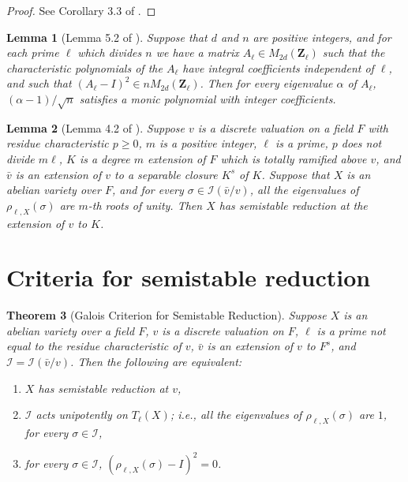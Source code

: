 \documentclass{amsart}
\def\Z{{\mathbf Z}}
\def\I{{\mathcal I}}
\newtheorem{thm}{Theorem}[section]
\newtheorem{lem}[thm]{Lemma}
\theoremstyle{definition}
\begin{document}
\begin{proof}
See Corollary 3.3 of \cite{serrelem}.
\end{proof}

\begin{lem}[Lemma 5.2 of \cite{semistab}]
\label{localglobal}
Suppose that $d$ and $n$ are positive integers, and for each prime $\ell$ 
which divides
$n$ we have a matrix $A_\ell \in M_{2d}(\Z_\ell)$ such that the
characteristic polynomials of the $A_\ell$ have integral coefficients
independent of $\ell$, and such that $(A_\ell - I)^2 \in nM_{2d}(\Z_\ell)$.
Then for every eigenvalue $\alpha$ of $A_\ell$, $(\alpha - 1)/\sqrt{n}$
satisfies a monic polynomial with integer coefficients.
\end{lem}

\begin{lem}[Lemma 4.2 of \cite{degree}]
\label{mevals}
Suppose $v$ is a discrete valuation on a field $F$ with residue
characteristic $p \ge 0$, $m$ is a positive integer, $\ell$ is a prime,
$p$ does not divide $m\ell$, $K$ is a degree $m$ extension of $F$
which is totally ramified above $v$, and ${\bar v}$ is an extension of $v$ to
a separable closure $K^s$ of $K$. Suppose that $X$ is an abelian variety over $F$,
and for every $\sigma \in \I({\bar v}/v)$,
all the eigenvalues of $\rho_{\ell,X}(\sigma)$ 
are $m$-th roots of unity. Then $X$ has
semistable reduction at the extension of $v$ to $K$.
\end{lem}

\section{Criteria for semistable reduction}

\begin{thm}[Galois Criterion for Semistable Reduction]
\label{galcrit}
Suppose $X$ is an abel\-ian variety over a field $F$, $v$ is a discrete 
valuation on $F$, $\ell$ is a prime not equal to the residue
characteristic of $v$, ${\bar v}$ is an extension of $v$ to $F^s$,
and $\I = \I({\bar v}/v)$. 
Then the following are equivalent:
\begin{enumerate}
\item[(i)] $X$ has semistable reduction at $v$,
\item[(ii)] $\I$ acts unipotently on $T_\ell(X)$; i.e.,
all the eigenvalues of $\rho_{\ell,X}(\sigma)$ are $1$, 
for every $\sigma \in \I$,
\item[(iii)] for every $\sigma \in \I$, 
$(\rho_{\ell,X}(\sigma) - I)^2 = 0$.
\end{enumerate}
\end{thm}
\end{document}

